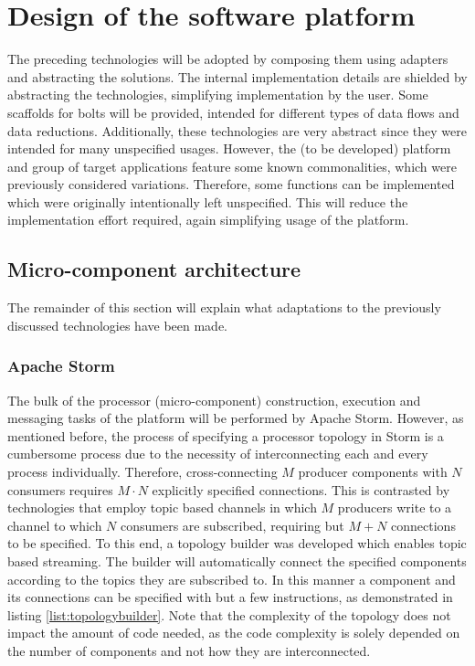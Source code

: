 \section{Design of the software platform}
The preceding technologies will be adopted by composing them using adapters and abstracting the solutions. The internal implementation details are shielded by abstracting the technologies, simplifying implementation by the user. Some scaffolds for bolts will be provided, intended for different types of data flows and data reductions. Additionally, these technologies are very abstract since they were intended for many unspecified usages. However, the (to be developed) platform and group of target applications feature some known commonalities, which were previously considered variations. Therefore, some functions can be implemented which were originally intentionally left unspecified. This will reduce the implementation effort required, again simplifying usage of the platform.

\subsection{Micro-component architecture}
The remainder of this section will explain what adaptations to the previously discussed technologies have been made.

\subsubsection*{Apache Storm}
The bulk of the processor (micro-component) construction, execution and messaging tasks of the platform will be performed by Apache Storm. However, as mentioned before, the process of specifying a processor topology in Storm is a cumbersome process due to the necessity of interconnecting each and every process individually. Therefore, cross-connecting $M$ producer components with $N$ consumers requires $M\cdot N$ explicitly specified connections. This is contrasted by technologies that employ topic based channels in which $M$ producers write to a channel to which $N$ consumers are subscribed, requiring but $M+N$ connections to be specified. To this end, a topology builder was developed which enables topic based streaming. The builder will automatically connect the specified components according to the topics they are subscribed to. In this manner a component and its connections can be specified with but a few instructions, as demonstrated in listing \ref{list:topologybuilder}. Note that the complexity of the topology does not impact the amount of code needed, as the code complexity is solely depended on the number of components and not how they are interconnected.

